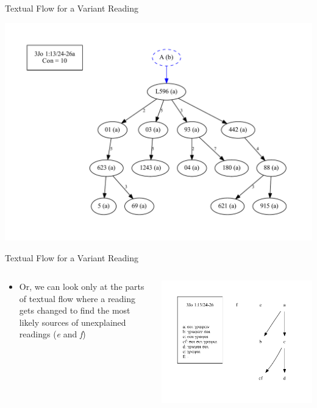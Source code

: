 \documentclass[10pt]{beamer}
\begin{document}
	\begin{frame}{Textual Flow for a Variant Reading}
		\begin{center}
			\includegraphics[width=\textwidth]{../graphics/B25K1V13U24-26Ra-coherence-attestations-b-initial.pdf}
		\end{center}
	\end{frame}
	\begin{frame}{Textual Flow for a Variant Reading}
		\begin{columns}
			\begin{column}{0.45\textwidth}
				\begin{itemize}
					\item Or, we can look only at the parts of textual flow where a reading gets changed to find the most likely sources of unexplained readings (\emph{e} and \emph{f})
				\end{itemize}
			\end{column}
			\begin{column}{0.45\textwidth}
				\begin{center}
					\includegraphics[width=\textwidth]{../graphics/B25K1V13U24-26-local-stemma-incomplete.pdf}
				\end{center}
			\end{column}
		\end{columns}
	\end{frame}
\end{document}
